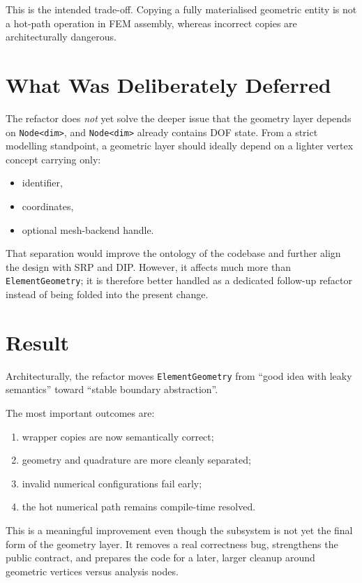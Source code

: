 This is the intended trade-off.  Copying a fully materialised geometric entity
is not a hot-path operation in FEM assembly, whereas incorrect copies are
architecturally dangerous.


\section{What Was Deliberately Deferred}
\label{sec:eg_deferred}

The refactor does \emph{not} yet solve the deeper issue that the geometry layer
depends on \texttt{Node<dim>}, and \texttt{Node<dim>} already contains DOF
state.  From a strict modelling standpoint, a geometric layer should ideally
depend on a lighter vertex concept carrying only:

\begin{itemize}[nosep]
  \item identifier,
  \item coordinates,
  \item optional mesh-backend handle.
\end{itemize}

That separation would improve the ontology of the codebase and further align
the design with SRP and DIP.  However, it affects much more than
\texttt{ElementGeometry}; it is therefore better handled as a dedicated
follow-up refactor instead of being folded into the present change.


\section{Result}
\label{sec:eg_result}

Architecturally, the refactor moves \texttt{ElementGeometry} from
``good idea with leaky semantics'' toward ``stable boundary abstraction''.

The most important outcomes are:

\begin{enumerate}[nosep]
  \item wrapper copies are now semantically correct;
  \item geometry and quadrature are more cleanly separated;
  \item invalid numerical configurations fail early;
  \item the hot numerical path remains compile-time resolved.
\end{enumerate}

This is a meaningful improvement even though the subsystem is not yet the final
form of the geometry layer.  It removes a real correctness bug, strengthens the
public contract, and prepares the code for a later, larger cleanup around
geometric vertices versus analysis nodes.
